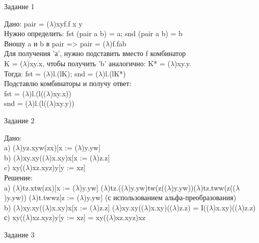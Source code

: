 \documentclass[a4paper,portrait,12pt]{article}
\begin{document}
\newpage

\begin{flushleft}
Задание 1
\end{flushleft}

\begin{flushleft}
Дано: pair = ($\lambda$)xyf.f x y \\
Нужно определить: fst (pair a b) = a; snd (pair a b) = b \\
Вношу a и b в pair => pair = ($\lambda$)f.fab \\
Для получения 'а', нужно подставить вместо f комбинатор \\
K = ($\lambda$)xy.x, чтобы получить 'b' аналогично: K* = ($\lambda$)xy.y. \\
Тогда: fst = ($\lambda$)l.(lK); snd = ($\lambda$)l.(lK*) \\
Подставлю комбинаторы и получу ответ: \\
fst = ($\lambda$)l.(l(($\lambda$)xy.x))\\
snd = ($\lambda$)l.(l(($\lambda$)xy.y))
\end{flushleft}

\begin{flushleft}
Задание 2
\end{flushleft}

\begin{flushleft}
Дано: \\
a) ($\lambda$)yz.xyw(zx)[x := ($\lambda$)y.yw] \\
b) ($\lambda$)xy.xy(($\lambda$)x.xy)x[x := ($\lambda$)z.z] \\
c) xy(($\lambda$)xz.xyz)y[y := xz] \\
Решение:\\
a) ($\lambda$)tz.xtw(zx)[x := ($\lambda$)y.yw] ($\lambda$)tz.(($\lambda$)y.yw)tw(z(($\lambda$)y.yw))($\lambda$)tz.tww(z(($\lambda$)y.yw)) ($\lambda$)t.twwz[z := ($\lambda$)y.yw] (с использованием альфа-преобразования)\\
b) ($\lambda$)xy.xy(($\lambda$)x.xy)x[x := ($\lambda$)z.z] ($\lambda$)xy.xy(($\lambda$)x.xy)(($\lambda$)z.z) = I(($\lambda$)x.xy)(($\lambda$)z.z)\\
с) xy(($\lambda$)xz.xyz)y[y := xz] = xy(($\lambda$)xz.xyz)xz
\end{flushleft}

\begin{flushleft}
Задание 3
\end{flushleft}
\end{document}
